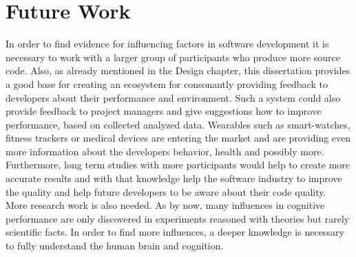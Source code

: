 \section{Future Work}
In order to find evidence for influencing factors in software development it is necessary to work with a larger group of participants who produce more source code.
\bigbreak
Also, as already mentioned in the Design chapter, this dissertation provides a good base for creating an ecosystem for consonantly providing feedback to developers about their performance and environment. Such a system could also provide feedback to project managers and give suggestions how to improve performance, based on collected analyzed data. 
\bigbreak
Wearables such as smart-watches, fitness trackers or medical devices are entering the market and are providing even more information about the developers behavior, health and possibly more.\\
Furthermore, long term studies with more participants would help to create more accurate results and with that knowledge help the software industry to improve the quality and help future developers to be aware about their code quality.\\
More research work is also needed. As by now, many influences in cognitive performance are only discovered in experiments reasoned with theories but rarely scientific facts. In order to find more influences, a deeper knowledge is necessary to fully understand the human brain and cognition. 

